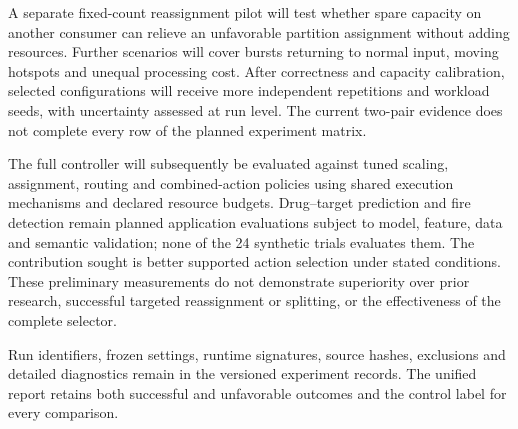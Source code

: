 A separate fixed-count reassignment pilot will test whether spare capacity on another consumer can relieve an unfavorable partition assignment without adding resources. Further scenarios will cover bursts returning to normal input, moving hotspots and unequal processing cost. After correctness and capacity calibration, selected configurations will receive more independent repetitions and workload seeds, with uncertainty assessed at run level. The current two-pair evidence does not complete every row of the planned experiment matrix.

The full controller will subsequently be evaluated against tuned scaling, assignment, routing and combined-action policies using shared execution mechanisms and declared resource budgets. Drug--target prediction and fire detection remain planned application evaluations subject to model, feature, data and semantic validation; none of the 24 synthetic trials evaluates them. The contribution sought is better supported action selection under stated conditions. These preliminary measurements do not demonstrate superiority over prior research, successful targeted reassignment or splitting, or the effectiveness of the complete selector.

Run identifiers, frozen settings, runtime signatures, source hashes, exclusions and detailed diagnostics remain in the versioned experiment records. The unified report retains both successful and unfavorable outcomes and the control label for every comparison.
